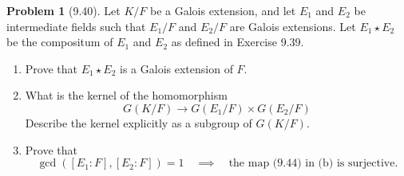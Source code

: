 \documentclass[12pt]{article}
\theoremstyle{definition}
\newtheorem{problem}{Problem}
\begin{document}
\begin{problem}[9.40]
    Let $K/F$ be a Galois extension, and let $E_1$ and $E_2$ be intermediate fields such that $E_1/F$ and $E_2/F$
    are Galois extensions. Let $E_1 \star E_2$ be the compositum of $E_1$ and $E_2$ as defined in Exercise 9.39.
    \begin{enumerate}[label=(\alph*)]
        \item Prove that $E_1 \star E_2$ is a Galois extension of $F$.
        \begin{solution}

        \end{solution}

        \item What is the kernel of the homomorphism
              \[
                  G(K/F) \longrightarrow G(E_1/F) \times G(E_2/F)
              \]
              Describe the kernel explicitly as a subgroup of $G(K/F)$.
        \begin{solution}

        \end{solution}

        \item Prove that
              \[
                    \gcd([E_1 : F], [E_2 : F]) = 1 \quad \implies \quad \text{the map (9.44) in (b) is surjective.}
              \]
        \begin{solution}

        \end{solution}
    \end{enumerate}
\end{problem}
\end{document}
